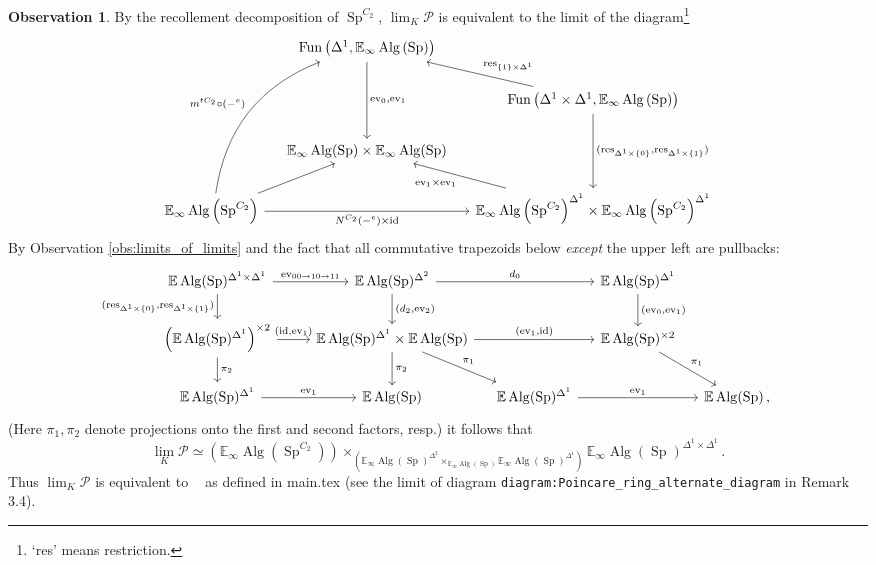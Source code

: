 \documentclass{article}
\DeclareMathOperator{\Alg}{Alg}
\DeclareMathOperator{\CAlgp}{CAlg^p} %
\DeclareMathOperator{\Fun}{Fun} %
\DeclareMathOperator{\id}{id} %
\DeclareMathOperator{\Spectra}{Sp} %
\newcommand{\EE}{\mathbb{E}}
\newcommand{\ev}{\mathrm{ev}}
\theoremstyle{definition}
\newtheorem{observation}[equation]{Observation}
\begin{document}
\begin{observation}
    By the recollement decomposition of $ \Spectra^{C_2} $, $ \lim_K \mathcal{P} $ is equivalent to the limit of the diagram\footnote{`res' means restriction.} 
    \begin{equation}%
    \begin{tikzcd}[column sep=small]
        & \Fun\left(\Delta^1,\EE_\infty\Alg\left(\Spectra\right)\right) \ar[dd,"{\mathrm{ev}_{0},\mathrm{ev}_{1}}"]  & \\
        & & \Fun\left(\Delta^1 \times \Delta^1,\EE_\infty\Alg\left(\Spectra\right)\right) \ar[dd,"{(\mathrm{res}_{\Delta^1 \times \{0\}},\mathrm{res}_{\Delta^1 \times \{1\}})}"] \ar[lu,"{\mathrm{res}_{\{1\} \times \Delta^1}}"'] \\
        &\EE_\infty\Alg(\Spectra) \times \EE_\infty\Alg(\Spectra) & \\
        \EE_\infty\Alg\left(\Spectra^{C_2}\right)  \ar[rr,"{N^{C_2}(-^e) \times \id}"'] \ar[ru] \ar[ruuu,"{m^{tC_2} \circ (-^e)}", bend left=30] & &\EE_\infty\Alg\left(\Spectra^{C_2}\right)^{\Delta^1} \times \EE_\infty\Alg\left(\Spectra^{C_2}\right)^{\Delta^1} \ar[lu,"{\ev_1 \times \ev_1}"]
    \end{tikzcd}
    \end{equation} 
    By Observation \ref{obs:limits_of_limits} and the fact that all commutative trapezoids below \emph{except} the upper left are pullbacks: 
    \begin{equation}
    \begin{tikzcd}[column sep=small]
        \EE\Alg(\Spectra)^{\Delta^1 \times \Delta^1} \ar[rr,"{\ev_{00\to10\to11}}"] \ar[d,"{(\mathrm{res}_{\Delta^1 \times \{0\}},\mathrm{res}_{\Delta^1 \times \{1\}})}"'] & & \EE\Alg(\Spectra)^{\Delta^2} \ar[d,"{(d_2,\ev_2)}"] \ar[rr,"{d_0}"] & & \EE\Alg(\Spectra)^{\Delta^1} \ar[d,"{(\ev_0,\ev_1)}"] & \\
        \left(\EE\Alg(\Spectra)^{\Delta^1}\right)^{\times 2} \ar[rr,"{(\id,\ev_1)}"] \ar[d,"{\pi_2}"] & &\EE\Alg(\Spectra)^{\Delta^1} \times \EE\Alg(\Spectra) \ar[rd,"{\pi_1}"] \ar[d,"{\pi_2}"] \ar[rr,"{(\ev_1, \id)}"] & & \EE\Alg(\Spectra)^{\times 2} \ar[rd,"{\pi_1}"] & \\
        \EE\Alg(\Spectra)^{\Delta^1} \ar[rr,"{\ev_1}"] & & \EE\Alg(\Spectra) & \EE\Alg(\Spectra)^{\Delta^1} \ar[rr,"{\ev_1}"] & & \EE\Alg(\Spectra)\,,
    \end{tikzcd}
    \end{equation} 
    (Here $ \pi_1, \pi_2 $ denote projections onto the first and second factors, resp.) 
    it follows that 
    \begin{equation*}
        \lim_K \mathcal{P} \simeq \left(\EE_\infty \Alg\left(\Spectra^{C_2}\right)\right) \times_{\left(\EE_\infty\Alg(\Spectra)^{\Delta^2} \times_{\EE_\infty \Alg(\Spectra)} \EE_\infty\Alg(\Spectra)^{\Delta^1}\right)} \EE_\infty\Alg(\Spectra)^{\Delta^1 \times \Delta^1} \,.
    \end{equation*}
    Thus $ \lim_K \mathcal{P} $ is equivalent to $ \CAlgp $ as defined in main.tex (see the limit of diagram \texttt{diagram:Poincare\_ring\_alternate\_diagram} in Remark 3.4). 
\end{observation}
\end{document}
